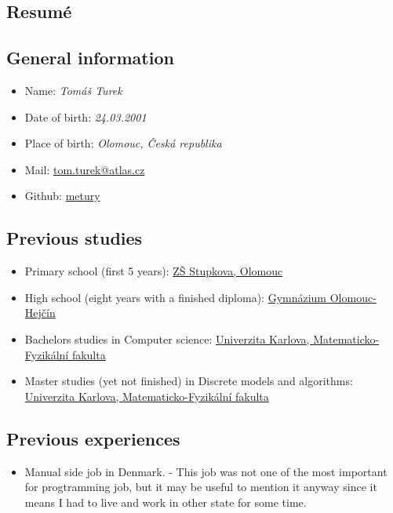 \documentclass[12pt,a4paper]{article}
\begin{document}
\begin{center}
\section*{Resumé}
\end{center}

\subsection*{General information}

\begin{itemize}
	\item Name: \textit{Tomáš Turek}
	\item Date of birth: \textit{24.03.2001}
	\item Place of birth: \textit{Olomouc, Česká republika}
	\item Mail: \href{mailto:tom.turek@atlas.cz}{tom.turek@atlas.cz}
	\item Github: \href{https://github.com/metury}{metury}
\end{itemize}

\subsection*{Previous studies}

\begin{itemize}
	\item Primary school (first 5 years): \href{https://zsstupkova.cz/}{ZŠ Stupkova, Olomouc}
	\item High school (eight years with a finished diploma): \href{https://www.gytool.cz/}{Gymnázium Olomouc-Hejčín}
	\item Bachelors studies in Computer science: \href{https://www.mff.cuni.cz/}{Univerzita Karlova, Matematicko-Fyzikální fakulta}
	\item Master studies (yet not finished) in Discrete models and algorithms: \href{https://www.mff.cuni.cz/}{Univerzita Karlova, Matematicko-Fyzikální fakulta}
\end{itemize}

\subsection*{Previous experiences}

\begin{itemize}
	\item Manual side job in Denmark. - This job was not one of the most important for progtramming job, but it may be useful to mention it anyway since it means I had to live and work in other state for some time.
\end{itemize}
\end{document}
